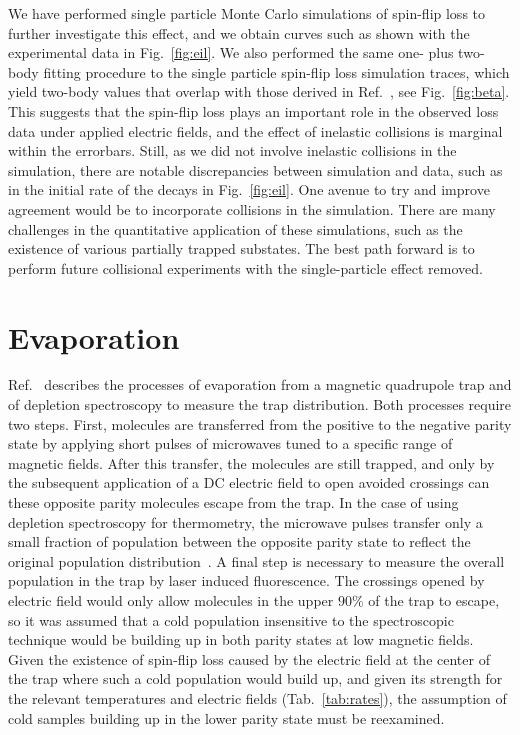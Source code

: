 \documentclass[%
 reprint,
 amsmath,amssymb,
 aps,
pra,
]{revtex4-1}
\begin{document}
We have performed single particle Monte Carlo simulations of spin-flip loss to further investigate this effect, and we obtain curves such as shown with the experimental data in Fig.~\ref{fig:eil}.
We also performed the same one- plus two-body fitting procedure to the single particle spin-flip loss simulation traces, which yield two-body values that overlap with those derived in Ref.~\cite{Stuhl2013}, see Fig.~\ref{fig:beta}.  This suggests that the spin-flip loss plays an important role in the observed loss data under applied electric fields, and the effect of inelastic collisions is marginal within the errorbars. Still, as we did not involve inelastic collisions in the simulation, there are notable discrepancies between simulation and data, such as in the initial rate of the decays in Fig.~\ref{fig:eil}.
One avenue to try and improve agreement would be to incorporate collisions in the simulation. There are many challenges in the quantitative application of these simulations, such as the existence of various partially trapped substates. The best path forward is to perform future collisional experiments with the single-particle effect removed.

\section{Evaporation\label{sec:evap}}

Ref.~\cite{Stuhl2012evap} describes the processes of evaporation from a magnetic quadrupole trap and of depletion spectroscopy to measure the trap distribution. Both processes require two steps.
First, molecules are transferred from the positive to the negative parity state by applying short pulses of microwaves tuned to a specific range of magnetic fields.
After this transfer, the molecules are still trapped, and only by the subsequent application of a DC electric field to open avoided crossings can these opposite parity molecules escape from the trap.
In the case of using depletion spectroscopy for thermometry, the microwave pulses transfer only a small fraction of population between the opposite parity state to reflect the original population distribution~\cite{Stuhl2012uwave}. A final step is necessary to measure the overall population in the trap by laser induced fluorescence.
The crossings opened by electric field would only allow molecules in the upper $90\%$ of the trap to escape, so it was assumed that a cold population insensitive to the spectroscopic technique would be building up in both parity states at low magnetic fields. Given the existence of spin-flip loss caused by the electric field at the center of the trap where such a cold population would build up, and given its strength for the relevant temperatures and electric fields (Tab.~\ref{tab:rates}), the assumption of cold samples building up in the lower parity state must be reexamined.
\end{document}
